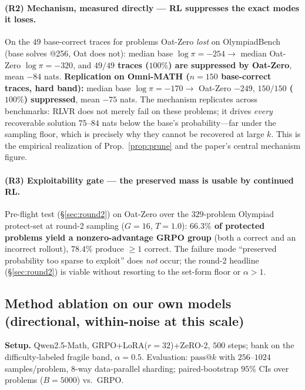 \documentclass[11pt]{article}
\makeatletter
\newcommand{\passk}{\text{pass@}k}
\theoremstyle{definition}
\makeatother
\begin{document}
\paragraph{(R2) Mechanism, measured directly --- RL suppresses the exact modes it loses.}
On the $49$ base-correct traces for problems Oat-Zero \emph{lost} on OlympiadBench (base solves @256,
Oat does not): median base $\log\pi = -254 \to$ median Oat-Zero $\log\pi = -320$, and \textbf{$49/49$
traces ($100\%$) are suppressed by Oat-Zero}, mean $-84$ nats.
\textbf{Replication on Omni-MATH ($n{=}150$ base-correct traces, hard band):}
median base $\log\pi=-170\to$ Oat-Zero $-249$, \textbf{$150/150$ ($100\%$) suppressed}, mean $-75$
nats. The mechanism replicates across benchmarks: RLVR does not merely fail on these problems; it
drives \emph{every} recoverable solution $75$--$84$ nats below the base's probability---far under
the sampling floor, which is precisely why they cannot be recovered at large $k$. This is the
empirical realization of Prop.~\ref{prop:prune} and the paper's central mechanism figure.

\paragraph{(R3) Exploitability gate --- the preserved mass is usable by continued RL.}
Pre-flight test (\S\ref{sec:round2}) on Oat-Zero over the $329$-problem Olympiad protect-set at
round-2 sampling ($G{=}16$, $T{=}1.0$): \textbf{$66.3\%$ of protected problems yield a nonzero-advantage
GRPO group} (both a correct and an incorrect rollout), $78.4\%$ produce $\ge1$ correct. The failure
mode ``preserved probability too sparse to exploit'' does \emph{not} occur; the round-2 headline
(\S\ref{sec:round2}) is viable without resorting to the set-form floor or $\alpha>1$.

\subsection{Method ablation on our own models (directional, within-noise at this scale)}
\textbf{Setup.} Qwen2.5-Math, GRPO+LoRA($r{=}32$)+ZeRO-2, $500$ steps; bank on the difficulty-labeled
fragile band, $\alpha{=}0.5$. Evaluation: $\passk$ with $256$--$1024$ samples/problem, $8$-way
data-parallel sharding; paired-bootstrap $95\%$ CIs over problems ($B{=}5000$) vs.\ GRPO.
\end{document}
